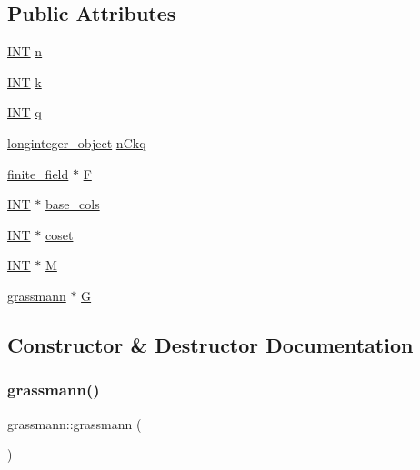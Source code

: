 \subsection*{Public Attributes}
\begin{DoxyCompactItemize}
\item 
\mbox{\hyperlink{galois_8h_a09fddde158a3a20bd2dcadb609de11dc}{I\+NT}} \mbox{\hyperlink{classgrassmann_a2559679fc4552f90f84aa3545c7834b0}{n}}
\item 
\mbox{\hyperlink{galois_8h_a09fddde158a3a20bd2dcadb609de11dc}{I\+NT}} \mbox{\hyperlink{classgrassmann_a00e5ae1bd671fb4666379f7b355db11f}{k}}
\item 
\mbox{\hyperlink{galois_8h_a09fddde158a3a20bd2dcadb609de11dc}{I\+NT}} \mbox{\hyperlink{classgrassmann_ad5dff52fd51c013782b3b128f0f1f965}{q}}
\item 
\mbox{\hyperlink{classlonginteger__object}{longinteger\+\_\+object}} \mbox{\hyperlink{classgrassmann_a56323be854e65e59d807524df6a55906}{n\+Ckq}}
\item 
\mbox{\hyperlink{classfinite__field}{finite\+\_\+field}} $\ast$ \mbox{\hyperlink{classgrassmann_ada0f668336cc7643fd7597d9099c3314}{F}}
\item 
\mbox{\hyperlink{galois_8h_a09fddde158a3a20bd2dcadb609de11dc}{I\+NT}} $\ast$ \mbox{\hyperlink{classgrassmann_a3327e327acf328cce1b981598cb9a67c}{base\+\_\+cols}}
\item 
\mbox{\hyperlink{galois_8h_a09fddde158a3a20bd2dcadb609de11dc}{I\+NT}} $\ast$ \mbox{\hyperlink{classgrassmann_aa519c9a9bc3be4ca8f8b27e1e8b3281e}{coset}}
\item 
\mbox{\hyperlink{galois_8h_a09fddde158a3a20bd2dcadb609de11dc}{I\+NT}} $\ast$ \mbox{\hyperlink{classgrassmann_ab855b34708cd25d313bfb5cc434dbfb0}{M}}
\item 
\mbox{\hyperlink{classgrassmann}{grassmann}} $\ast$ \mbox{\hyperlink{classgrassmann_af23859a453238145856f25be67e6e479}{G}}
\end{DoxyCompactItemize}


\subsection{Constructor \& Destructor Documentation}
\mbox{\label{classgrassmann_a252a85d3b74eb4fbd5771f4152a5f272}} 
\subsubsection{\texorpdfstring{grassmann()}{grassmann()}}
{\footnotesize\ttfamily grassmann\+::grassmann (\begin{DoxyParamCaption}{ }\end{DoxyParamCaption})}

